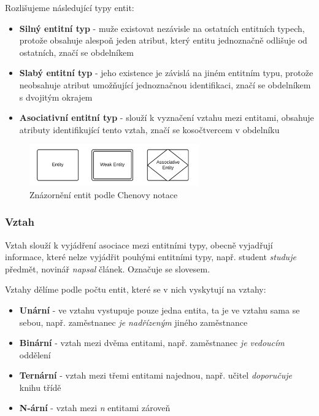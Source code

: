 \documentclass[czech,bachelor,public,dept460,male,oneside]{diploma}
\begin{document}
	\noindent Rozlišujeme následující typy entit:

	\begin{itemize}
		\item \textbf{Silný entitní typ} - muže existovat nezávisle na ostatních entitních typech, protože obsahuje alespoň jeden atribut, který entitu jednoznačně odlišuje od ostatních, značí se obdelníkem
		
		\item \textbf{Slabý entitní typ} - jeho existence je závislá na jiném entitním typu, protože neobsahuje atribut umožňující jednoznačnou identifikaci, značí se obdelníkem s dvojitým okrajem
		
		\item \textbf{Asociativní entitní typ} - slouží k vyznačení vztahu mezi entitami, obsahuje atributy identifikující tento vztah, značí se kosočtvercem v obdelníku
	\end{itemize}

	\begin{figure}[!h]
		\centering
		\includegraphics[width=0.65\textwidth]{Figures/ChenEntities}
		\caption{Znázornění entit podle Chenovy notace}
	\end{figure}

	\subsubsection{Vztah}
	Vztah slouží k vyjádření asociace mezi entitními typy, obecně vyjadřují informace, které nelze vyjádřit pouhými entitními typy, např. student \textit{studuje} předmět, novinář \textit{napsal} článek. Označuje se slovesem.
	
	Vztahy dělíme podle počtu entit, které se v nich vyskytují na vztahy:
	
	\begin{itemize}
		\item \textbf{Unární} - ve vztahu vystupuje pouze jedna entita, ta je ve vztahu sama se sebou, např. zaměstnanec \textit{je nadřízeným} jiného zaměstnance
		\item \textbf{Binární} - vztah mezi dvěma entitami, např. zaměstnanec \textit{je vedoucím} oddělení
		\item \textbf{Ternární} - vztah mezi třemi entitami najednou, např. učitel \textit{doporučuje} knihu třídě
		\item \textbf{N-ární} - vztah mezi \textit{n} entitami zároveň
	\end{itemize}
	
\end{document}
